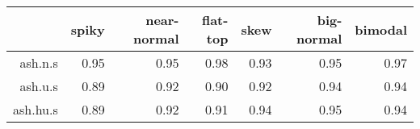 \begin{tabular}{rrrrrrr}
  \toprule  & spiky & near-normal & flat-top & skew & big-normal & bimodal \\ 
  \midrule ash.n.s & 0.95 & 0.95 & 0.98 & 0.93 & 0.95 & 0.97 \\ 
  ash.u.s & 0.89 & 0.92 & 0.90 & 0.92 & 0.94 & 0.94 \\ 
  ash.hu.s & 0.89 & 0.92 & 0.91 & 0.94 & 0.95 & 0.94 \\ 
   \bottomrule \end{tabular}

